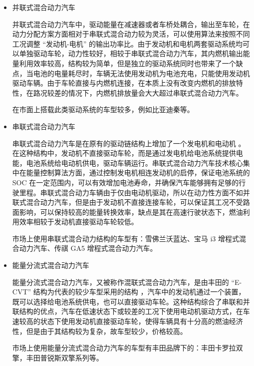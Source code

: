 \begin{itemize}

	\item 并联式混合动力汽车

	      并联式混合动力汽车中，驱动能量在减速器或者车桥处耦合，输出至车轮，在动力分配方案方面相对于串联式混合动力较为灵活，可以使用算法来按照不同工况调整 “发动机-电机” 的输出功率比。由于发动机和电机两套驱动系统均可以单独驱动车轮，动力性较好，相较于串联式混合动力汽车，其内燃机输出能量利用效率较高，结构较为简单，但是独立的驱动系统同时也带来了一个缺点，当电池的电量耗尽时，车辆无法使用发动机为电池充电，只能使用发动机驱动车辆。由于车轮直接与内燃机连接，在本质上没有改变内燃机的排放特性，在路况较差的情况下，内燃机排放量会大大超过串联式混合动力汽车。

	      在市面上搭载此类驱动系统的车型较多，例如比亚迪秦等。

	\item 串联式混合动力汽车

	      串联式混合动力汽车是在原有的驱动链结构上增加了一个发电机和电动机 \cite{串联式混合动力电动汽车先导车的研究开发}。在这种结构中，发动机不直接驱动车轮，而是通过发电机给电池系统提供电能，电池系统给电动机供电，驱动车辆运行。串联式混合动力汽车技术核心集中在能量控制算法方面，通过控制发电机相连发动机的启停，保证电池系统的 SOC 在一定范围内，可以有效增加电池寿命，并确保汽车能够拥有足够的行驶里程。串联式混合动力车辆由于仅由电动机驱动，所以在动力性方面不如并联式混合动力汽车，但是由于发动机不直接连接车轮，可以保证其工况不受路面影响，可以保持较高的能量转换效率，缺点是其在高速行驶状态下，燃油利用效率相较于发动机直接驱动车轮较低。

	      市场上使用串联式混合动力结构的车型有：雪佛兰沃蓝达、宝马 i3 增程式混合动力汽车、传祺 GA5 增程式混合动力汽车。

	\item 能量分流式混合动力汽车

	      能量分流式混合动力汽车，又被称作混联式混合动力汽车，是由丰田的 “E-CVT” 结构为代表的较少车型采用的结构 \cite{2006E-CVTHYBRIDTRANSMISSION}，汽车中的发动机通过一个装置，既可以选择给电池系统供电，也可以直接驱动车轮。这种结构综合了串联和并联结构的优点，汽车在低速状态下或较差的工况下使用电动机驱动方式，在车速较高的状态下使用发动机直接驱动车轮，使得车辆具有十分高的燃油经济性，但是由于其结构较为复杂，故车型较少，价格较高。

	      市场上使用能量分流式混合动力汽车的车型有丰田品牌下的：丰田卡罗拉双擎，丰田普锐斯双擎系列等。
\end{itemize}

